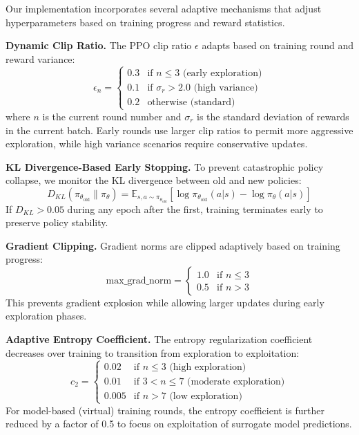 \documentclass[conference]{IEEEtran}
\begin{document}
Our implementation incorporates several adaptive mechanisms that adjust hyperparameters based on training progress and reward statistics.

\textbf{Dynamic Clip Ratio.} The PPO clip ratio $\epsilon$ adapts based on training round and reward variance:
%
\begin{equation}
\epsilon_n = \begin{cases}
0.3 & \text{if } n \leq 3 \text{ (early exploration)} \\
0.1 & \text{if } \sigma_r > 2.0 \text{ (high variance)} \\
0.2 & \text{otherwise (standard)}
\end{cases}
\end{equation}
%
where $n$ is the current round number and $\sigma_r$ is the standard deviation of rewards in the current batch. Early rounds use larger clip ratios to permit more aggressive exploration, while high variance scenarios require conservative updates.

\textbf{KL Divergence-Based Early Stopping.} To prevent catastrophic policy collapse, we monitor the KL divergence between old and new policies:
%
\begin{equation}
D_{KL}(\pi_{\theta_{\text{old}}} \| \pi_{\theta}) = \mathbb{E}_{s,a \sim \pi_{\theta_{\text{old}}}}\left[\log \pi_{\theta_{\text{old}}}(a|s) - \log \pi_{\theta}(a|s)\right]
\end{equation}
%
If $D_{KL} > 0.05$ during any epoch after the first, training terminates early to preserve policy stability.

\textbf{Gradient Clipping.} Gradient norms are clipped adaptively based on training progress:
%
\begin{equation}
\text{max\_grad\_norm} = \begin{cases}
1.0 & \text{if } n \leq 3 \\
0.5 & \text{if } n > 3
\end{cases}
\end{equation}
%
This prevents gradient explosion while allowing larger updates during early exploration phases.

\textbf{Adaptive Entropy Coefficient.} The entropy regularization coefficient decreases over training to transition from exploration to exploitation:
%
\begin{equation}
c_2 = \begin{cases}
0.02 & \text{if } n \leq 3 \text{ (high exploration)} \\
0.01 & \text{if } 3 < n \leq 7 \text{ (moderate exploration)} \\
0.005 & \text{if } n > 7 \text{ (low exploration)}
\end{cases}
\end{equation}
%
For model-based (virtual) training rounds, the entropy coefficient is further reduced by a factor of 0.5 to focus on exploitation of surrogate model predictions.
\end{document}
